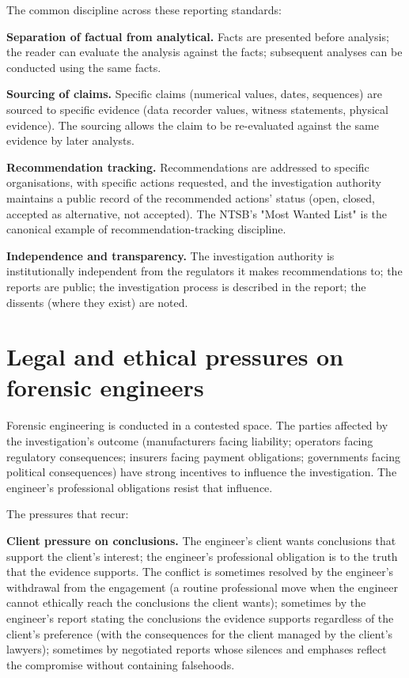 The common discipline across these reporting standards:

\textbf{Separation of factual from analytical.} Facts are presented before analysis; the reader can evaluate the analysis against the facts; subsequent analyses can be conducted using the same facts.

\textbf{Sourcing of claims.} Specific claims (numerical values, dates, sequences) are sourced to specific evidence (data recorder values, witness statements, physical evidence). The sourcing allows the claim to be re-evaluated against the same evidence by later analysts.

\textbf{Recommendation tracking.} Recommendations are addressed to specific organisations, with specific actions requested, and the investigation authority maintains a public record of the recommended actions' status (open, closed, accepted as alternative, not accepted). The NTSB's "Most Wanted List" is the canonical example of recommendation-tracking discipline.

\textbf{Independence and transparency.} The investigation authority is institutionally independent from the regulators it makes recommendations to; the reports are public; the investigation process is described in the report; the dissents (where they exist) are noted.

\section{Legal and ethical pressures on forensic engineers}

Forensic engineering is conducted in a contested space. The parties affected by the investigation's outcome (manufacturers facing liability; operators facing regulatory consequences; insurers facing payment obligations; governments facing political consequences) have strong incentives to influence the investigation. The engineer's professional obligations resist that influence.

The pressures that recur:

\textbf{Client pressure on conclusions.} The engineer's client wants conclusions that support the client's interest; the engineer's professional obligation is to the truth that the evidence supports. The conflict is sometimes resolved by the engineer's withdrawal from the engagement (a routine professional move when the engineer cannot ethically reach the conclusions the client wants); sometimes by the engineer's report stating the conclusions the evidence supports regardless of the client's preference (with the consequences for the client managed by the client's lawyers); sometimes by negotiated reports whose silences and emphases reflect the compromise without containing falsehoods.

